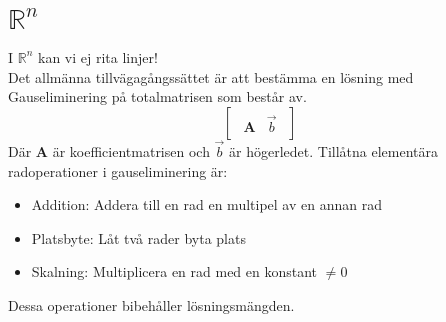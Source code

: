 \section{$\mathbb{R}^n$} %
\label{sec: R^n}
I $\mathbb{R}^n$ kan vi ej rita linjer!\\
Det allmänna tillvägagångssättet är att bestämma en lösning med Gauseliminering på totalmatrisen som består av.
\[
    \begin{bmatrix}
    \begin{array}{c|c}
    	\mathbf{A} & \vec{b}
    \end{array}
    \end{bmatrix}
\]
Där \textbf{A} är koefficientmatrisen och $\vec{b}$ är högerledet.
Tillåtna elementära radoperationer i gauseliminering är:
\begin{itemize}
	\item Addition: Addera till en rad en multipel av en annan rad
	\item Platsbyte: Låt två rader byta plats
	\item Skalning: Multiplicera en rad med en konstant $\neq 0$
\end{itemize}
Dessa operationer bibehåller lösningsmängden.
\newpage

